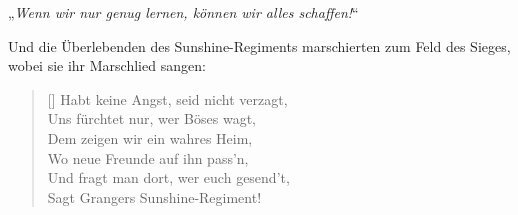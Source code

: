 „\emph{Wenn wir nur genug lernen, können wir alles schaffen!}“

Und die Überlebenden des Sunshine-Regiments marschierten zum Feld des Sieges, wobei sie ihr Marschlied sangen:

\baselineskip\settowidth{\versewidth}{Und fragt man dort, wer euch gesend’t,}
\begin{verse}[\versewidth]
Habt keine Angst, seid nicht verzagt,\\
Uns fürchtet nur, wer Böses wagt,\\
Dem zeigen wir ein wahres Heim,\\
Wo neue Freunde auf ihn pass’n,\\
Und fragt man dort, wer euch gesend’t,\\
Sagt Grangers Sunshine-Regiment!
\end{verse}
